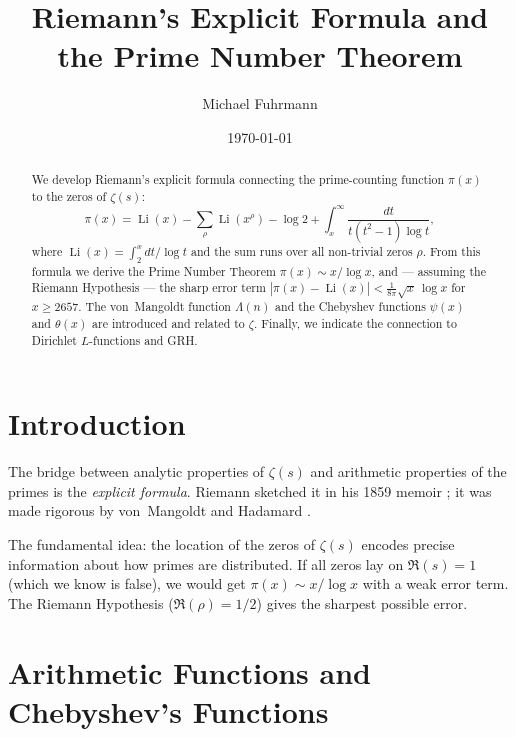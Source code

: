 \documentclass[12pt,a4paper]{amsart}
\theoremstyle{definition}
\DeclareMathOperator{\Li}{Li}
\begin{document}

\title{Riemann's Explicit Formula and the Prime Number Theorem}

\author{Michael Fuhrmann}
\address{Specialist Mathematics Project, Build 84}
\date{\today}

\begin{abstract}
We develop Riemann's explicit formula connecting the prime-counting function
$\pi(x)$ to the zeros of $\zeta(s)$:
\[
  \pi(x) = \Li(x) - \sum_\rho \Li(x^\rho) - \log 2
  + \int_x^{\infty} \frac{dt}{t(t^2-1)\log t},
\]
where $\Li(x) = \int_2^x dt/\log t$ and the sum runs over all non-trivial
zeros $\rho$.  From this formula we derive the Prime Number Theorem
$\pi(x) \sim x/\log x$, and --- assuming the Riemann Hypothesis ---
the sharp error term
$|\pi(x) - \Li(x)| < \tfrac{1}{8\pi}\sqrt{x}\,\log x$ for $x \ge 2657$.
The von~Mangoldt function $\Lambda(n)$ and the Chebyshev functions
$\psi(x)$ and $\theta(x)$ are introduced and related to $\zeta$.
Finally, we indicate the connection to Dirichlet $L$-functions and GRH.
\end{abstract}

\maketitle
\tableofcontents

\section{Introduction}

The bridge between analytic properties of $\zeta(s)$ and arithmetic
properties of the primes is the \emph{explicit formula}.  Riemann sketched
it in his 1859 memoir \cite{Riemann1859}; it was made rigorous by von~Mangoldt
\cite{vonMangoldt1895} and Hadamard \cite{Hadamard1896}.

The fundamental idea: the location of the zeros of $\zeta(s)$ encodes
precise information about how primes are distributed.  If all zeros lay
on $\Re(s) = 1$ (which we know is false), we would get $\pi(x) \sim x/\log x$
with a weak error term.  The Riemann Hypothesis ($\Re(\rho) = 1/2$)
gives the sharpest possible error.

\section{Arithmetic Functions and Chebyshev's Functions}
\end{document}
